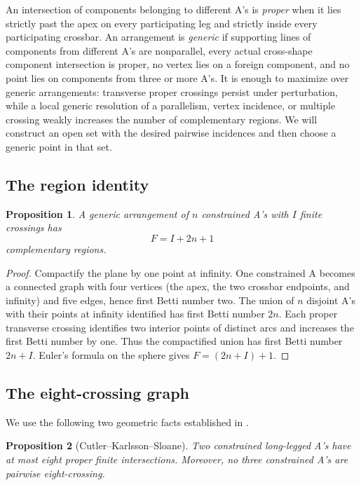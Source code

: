 \documentclass[11pt]{amsart}
\newtheorem{proposition}[proposition]{Proposition}
\theoremstyle{definition}
\begin{document}
An intersection of components belonging to different A's is \emph{proper}
when it lies strictly past the apex on every participating leg and strictly
inside every participating crossbar.  An arrangement is \emph{generic} if
supporting lines of components from different A's are nonparallel, every
actual cross-shape component intersection is proper, no vertex lies on a
foreign component, and no point lies on components from three or more
A's.  It is enough to maximize over generic arrangements: transverse proper
crossings persist under perturbation, while a local generic resolution of a
parallelism, vertex incidence, or multiple crossing weakly increases the
number of complementary regions.  We will construct an open set with the
desired pairwise incidences and then choose a generic point in that set.

\subsection{The region identity}

\begin{proposition}\label{prop:regions}
A generic arrangement of $n$ constrained A's with $I$ finite crossings has
\[
 F=I+2n+1
\]
complementary regions.
\end{proposition}

\begin{proof}
Compactify the plane by one point at infinity.  One constrained A becomes a
connected graph with four vertices (the apex, the two crossbar endpoints,
and infinity) and five edges, hence first Betti number two.  The union of
$n$ disjoint A's with their points at infinity identified has first Betti
number $2n$.  Each proper transverse crossing identifies two interior
points of distinct arcs and increases the first Betti number by one.  Thus
the compactified union has first Betti number $2n+I$.  Euler's formula on
the sphere gives $F=(2n+I)+1$.
\end{proof}

\subsection{The eight-crossing graph}

We use the following two geometric facts established in \cite[Sec.~13.2]{CKS2026}.

\begin{proposition}[Cutler--Karlsson--Sloane]\label{prop:localfacts}
Two constrained long-legged A's have at most eight proper finite
intersections.  Moreover, no three constrained A's are pairwise
 eight-crossing.
\end{proposition}
\end{document}
